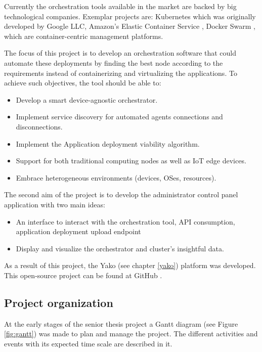         Currently the orchestration tools available in the market are backed by big technological companies. Exemplar projects are: Kubernetes \cite{cloud_native_computing_foundation_operating_nodate} which was originally developed by Google LLC, Amazon's Elastic Container Service \cite{amazon_inc_fully_nodate}, Docker Swarm \cite{docker_swarm_2022}, which are container-centric management platforms.
        
        The focus of this project is to develop an orchestration software that could automate these deployments by finding the best node according to the requirements instead of containerizing and virtualizing the applications. To achieve such objectives, the tool should be able to:
        
        \begin{itemize}
            \item Develop a smart device-agnostic orchestrator.
            \item Implement service discovery for automated agents connections and disconnections.
            \item Implement the Application deployment viability algorithm.
            \item Support for both traditional computing nodes as well as IoT edge devices.
            \item Embrace heterogeneous environments (devices, OSes, resources).
        \end{itemize}
        
        The second aim of the project is to develop the administrator control panel application with two main ideas:
        
        \begin{itemize}
            \item An interface to interact with the orchestration tool, API consumption, application deployment upload endpoint
            \item Display and visualize the orchestrator and cluster's insightful data.
        \end{itemize}
        
        As a result of this project, the Yako (see chapter \ref{yako}) platform was developed. This open-source project can be found at GitHub \cite{chen_yako_2022, chen_yakoui_2022}.
            
    \subsection{Project organization}
        At the early stages of the senior thesis project a Gantt diagram (see Figure \ref{fig:gantt}) was made to plan and manage the project. The different activities and events with its expected time scale are described in it.
        
